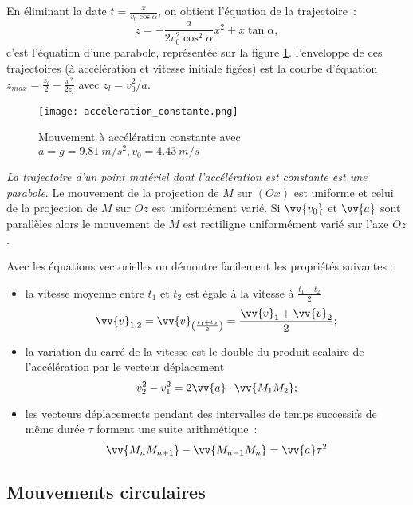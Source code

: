 En éliminant la date \(t=\frac{x}{v_0\cos\alpha}\), on obtient l'équation de la trajectoire~:
\begin{equation}
  z = -\frac{a}{2v_0^2\cos^2\alpha}x^2+x\tan\alpha,
\end{equation}
c'est l'équation d'une parabole, représentée sur la figure \ref{fig:acceleration_constante}. l'enveloppe de ces trajectoires (à accélération et vitesse initiale figées) est la courbe d'équation \(z_{max} = \frac{z_l}{2} - \frac{x^2}{2 z_l}\) avec \(z_l = v_0^2/a\).

\begin{figure}
	\centering
	\texttt{[image: acceleration\_constante.png]}
	\caption{Mouvement à accélération constante avec \(a = g = \SI{9,81}{m/s^2}, v_0=\SI{4.43}{m/s}\)}
	\label{fig:acceleration_constante}
\end{figure}
\emph{La trajectoire d'un point matériel dont l'accélération est constante est une parabole}. Le mouvement de la projection de \(M\) sur \((Ox)\) est uniforme et celui de la projection de \(M\) sur \(Oz\) est uniformément varié. Si \(\vv{v_0}\) et \(\vv{a}\) sont parallèles alors le mouvement de \(M\) est rectiligne uniformément varié sur l'axe \(Oz\).

Avec les équations vectorielles on démontre facilement les propriétés suivantes~:
\begin{itemize}
\item la vitesse moyenne entre \(t_1\) et \(t_2\) est égale à la vitesse à \(\frac{t_1+t_2}{2}\)
  \begin{equation}
    \vv{v}_{1,2}=\vv{v}_{\left(\frac{t_1+t_2}{2}\right)}=\frac{\vv{v}_1+\vv{v}_2}{2};
  \end{equation}
\item la variation du carré de la vitesse est le double du produit scalaire de l'accélération par le vecteur déplacement
  \begin{equation}
v_2^2-v_1^2=2\vv{a}\cdot \vv{M_1M_2};
  \end{equation}
\item les vecteurs déplacements pendant des intervalles de temps successifs de même durée \(\tau\) forment une suite arithmétique~:
  \begin{equation}
    \vv{M_nM_{n+1}}-\vv{M_{n-1}M_{n}}=\vv{a}\tau^2
  \end{equation}
\end{itemize}

\subsection{Mouvements circulaires}
\label{chap1-subsec:mvtcirc}

